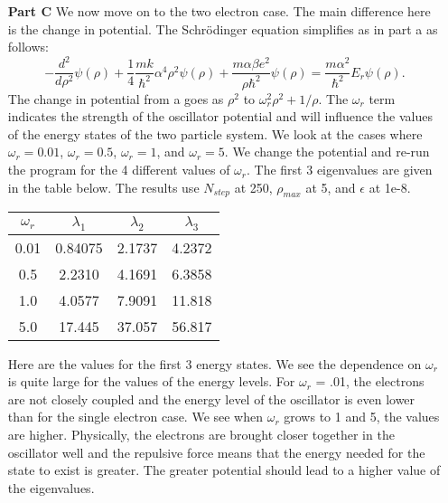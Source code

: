 \documentclass[11pt,a4wide]{article}
\begin{document}
\begin{enumerate}
\item[\bf Part C]
We now move on to the two electron case. The main difference here is the change in potential. The Schr\"odinger equation simplifies as in part a as follows: 
\[
  -\frac{d^2}{d\rho^2} \psi(\rho) 
       + \frac{1}{4}\frac{mk}{\hbar^2} \alpha^4\rho^2\psi(\rho)+\frac{m\alpha \beta e^2}{\rho\hbar^2}\psi(\rho)  = 
\frac{m\alpha^2}{\hbar^2}E_r \psi(\rho) .
\]
The change in potential from a goes as $\rho^2$ to $\omega_r^2\rho^2+1/\rho$. The $\omega_r$ term indicates the strength of the oscillator potential and will influence the values of the energy states of the two particle system. We look at the cases where $\omega_r = 0.01$, $\omega_r = 0.5$, $\omega_r =1$, and $\omega_r = 5$.  We change the potential and re-run the program for the 4 different values of $\omega_r$. The first 3 eigenvalues are given in the table below. The results use $N_{step}$ at 250, $\rho_{max}$ at 5, and $\epsilon$ at 1e-8. 
\newline
\begin{center}
    \begin{tabular}{| c | c | c | c |}
    \hline
    \bf $\omega_r$	& \bf  $\lambda_1$	 & \bf  $\lambda_{2}$ & \bf  $\lambda_{3}$ \\ \hline
	0.01 & 0.84075	 & 2.1737 &  4.2372\\ \hline
	0.5 & 2.2310 & 4.1691  & 6.3858 \\ \hline
	1.0 & 4.0577 & 7.9091 & 11.818\\ \hline
	5.0 & 17.445 & 37.057 & 56.817 \\ 
	 \hline	
    \end{tabular}
\end{center}
Here are the values for the first 3 energy states. We see the dependence on $\omega_r$ is quite large for the values of the energy levels. For $\omega_r$ = .01, the electrons are not closely coupled and the energy level of the oscillator is even lower than for the single electron case. We see when $\omega_r$ grows to 1 and 5, the values are higher. Physically, the electrons are brought closer together in the oscillator well and the repulsive force means that the energy needed for the state to exist is greater. The greater potential should lead to a higher value of the eigenvalues. 


\end{enumerate}
\end{document}
